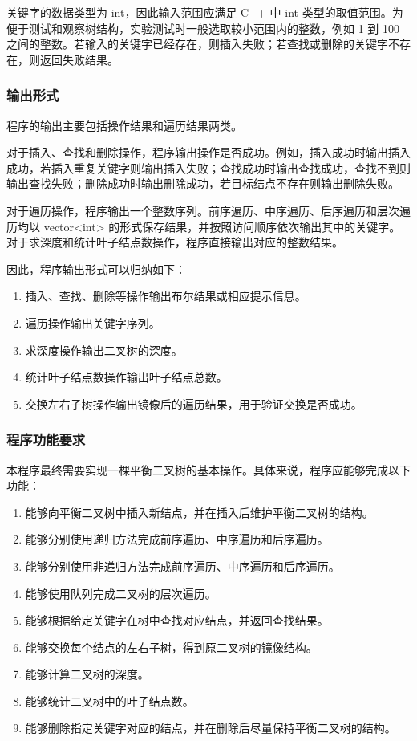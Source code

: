 \documentclass[a4paper, 12pt, oneside]{article}
\theoremstyle{cn_theorem}
\begin{document}
关键字的数据类型为 int，因此输入范围应满足 C++ 中 int 类型的取值范围。为便于测试和观察树结构，实验测试时一般选取较小范围内的整数，例如 1 到 100 之间的整数。若输入的关键字已经存在，则插入失败；若查找或删除的关键字不存在，则返回失败结果。

\subsubsection{输出形式}

程序的输出主要包括操作结果和遍历结果两类。

对于插入、查找和删除操作，程序输出操作是否成功。例如，插入成功时输出插入成功，若插入重复关键字则输出插入失败；查找成功时输出查找成功，查找不到则输出查找失败；删除成功时输出删除成功，若目标结点不存在则输出删除失败。

对于遍历操作，程序输出一个整数序列。前序遍历、中序遍历、后序遍历和层次遍历均以 vector\textless{}int\textgreater{} 的形式保存结果，并按照访问顺序依次输出其中的关键字。对于求深度和统计叶子结点数操作，程序直接输出对应的整数结果。

因此，程序输出形式可以归纳如下：

\begin{enumerate}
    \item 插入、查找、删除等操作输出布尔结果或相应提示信息。
    \item 遍历操作输出关键字序列。
    \item 求深度操作输出二叉树的深度。
    \item 统计叶子结点数操作输出叶子结点总数。
    \item 交换左右子树操作输出镜像后的遍历结果，用于验证交换是否成功。
\end{enumerate}

\subsubsection{程序功能要求}

本程序最终需要实现一棵平衡二叉树的基本操作。具体来说，程序应能够完成以下功能：

\begin{enumerate}
    \item 能够向平衡二叉树中插入新结点，并在插入后维护平衡二叉树的结构。
    \item 能够分别使用递归方法完成前序遍历、中序遍历和后序遍历。
    \item 能够分别使用非递归方法完成前序遍历、中序遍历和后序遍历。
    \item 能够使用队列完成二叉树的层次遍历。
    \item 能够根据给定关键字在树中查找对应结点，并返回查找结果。
    \item 能够交换每个结点的左右子树，得到原二叉树的镜像结构。
    \item 能够计算二叉树的深度。
    \item 能够统计二叉树中的叶子结点数。
    \item 能够删除指定关键字对应的结点，并在删除后尽量保持平衡二叉树的结构。
\end{enumerate}
\end{document}
